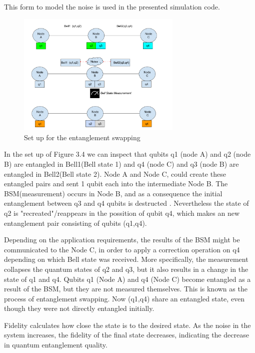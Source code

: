 \documentclass[12pt,a4paper] {report}
\begin{document}
		This form to model the noise is used in the presented simulation code.
	
		\begin{figure}[h!]
			\centering
			\includegraphics[width=0.7\textwidth]{repeater/entanglement_swap.png}
			\caption{Set up for the entanglement swapping}
			\label{fig:}
		\end{figure}		

		In the set up of Figure 3.4 we can inspect that qubits q1 (node A) and q2 (node B) are
		entangled in Bell1(Bell state 1) and q4 (node C) and q3 (node B) are entangled in Bell2(Bell state 2).
		Node A and Node C, could create these entangled pairs and sent 1 qubit each into the intermediate
		Node B. The BSM(measurement) occurs in Node B, and as a consequence the initial entanglement between
		q3 and q4 qubits is destructed \cite{rfc}. Nevertheless the state of q2 is "recreated"/reappears in the possition
		of qubit q4, which makes an new entanglement pair consisting of qubits (q1,q4).

		Depending on the application requirements, the results of the BSM might be communicated to the Node C, in order
		to apply a correction operation on q4 depending on which Bell state was received. More specifically, the measurement
		collapses the quantum states of q2 and q3, but it also results in a change in the state of q1 and q4.
		Qubits q1 (Node A) and q4 (Node C) become entangled as a result of the BSM, but they are not measured themselves.
		This is known as the process of entanglement swapping. Now (q1,q4) share an entangled state, even though they 
		were not directly entangled initially.

		Fidelity calculates how close the state is to the desired state. 
		As the noise in the system increases, the fidelity of the final state decreases,
		indicating the decrease in quantum entanglement quality.
\end{document}
